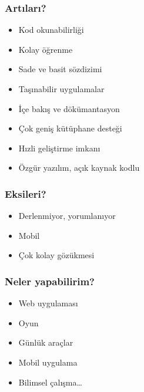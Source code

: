 \documentclass[10pt, compress]{beamer}
\begin{document}

\begin{frame}[fragile]
    \frametitle{Artıları?}
    \begin{itemize}[<+- | alert@+>]
        \item Kod okunabilirliği
        \item Kolay öğrenme
        \item Sade ve basit sözdizimi
        \item Taşınabilir uygulamalar
        \item İçe bakış ve dökümantasyon
        \item Çok geniş kütüphane desteği
        \item Hızli geliştirme imkanı
        \item Özgür yazılım, açık kaynak kodlu
    \end{itemize}  
\end{frame}


\begin{frame}[fragile]
    \frametitle{Eksileri?}
    \begin{itemize}[<+- | alert@+>]
        \item Derlenmiyor, yorumlanıyor
        \item Mobil
        \item Çok kolay gözükmesi
    \end{itemize}  
\end{frame}


\begin{frame}[fragile]
    \frametitle{Neler yapabilirim?}
    \begin{itemize}[<+- | alert@+>]
        \item Web uygulaması
        \item Oyun
        \item Günlük araçlar
        \item Mobil uygulama
        \item Bilimsel çalışma\ldots 
    \end{itemize}  
\end{frame}
\end{document}
